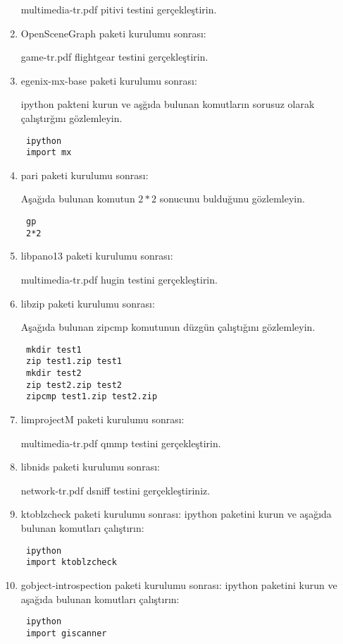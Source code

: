 \documentclass[a4paper,10pt]{article}
\begin{document}
\begin{enumerate}
multimedia-tr.pdf pitivi testini gerçekleştirin.

\item OpenSceneGraph paketi kurulumu sonrası:

game-tr.pdf flightgear testini gerçekleştirin.

\item egenix-mx-base paketi kurulumu sonrası:

ipython pakteni kurun ve aşğıda bulunan komutların sorusuz olarak çalıştırğını gözlemleyin.

\begin{verbatim}
 ipython
 import mx
\end{verbatim}


\item pari paketi kurulumu sonrası:

Aşağıda bulunan komutun $2*2$ sonucunu bulduğunu gözlemleyin.
\begin{verbatim}
 gp 
 2*2
\end{verbatim}

\item libpano13 paketi kurulumu sonrası:
  
multimedia-tr.pdf hugin testini gerçekleştirin.

\item libzip paketi kurulumu sonrası:

Aşağıda bulunan zipcmp komutunun düzgün çalıştığını gözlemleyin.
\begin{verbatim}
 mkdir test1
 zip test1.zip test1
 mkdir test2
 zip test2.zip test2
 zipcmp test1.zip test2.zip
\end{verbatim}

\item limprojectM paketi kurulumu sonrası:
  
multimedia-tr.pdf qmmp testini gerçekleştirin.

\item libnids paketi kurulumu sonrası:

network-tr.pdf dsniff testini gerçekleştiriniz.

\item ktoblzcheck paketi kurulumu sonrası:
ipython paketini kurun ve aşağıda bulunan komutları çalıştırın:
\begin{verbatim}
 ipython
 import ktoblzcheck
\end{verbatim}


\item gobject-introspection paketi kurulumu sonrası:
ipython paketini kurun ve aşağıda bulunan komutları çalıştırın:
\begin{verbatim}
 ipython
 import giscanner
\end{verbatim}



\end{enumerate}
\end{document}

